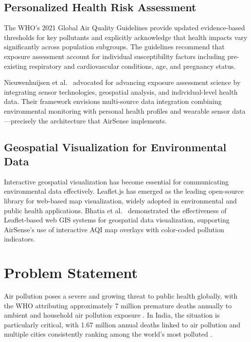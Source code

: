 \documentclass[12pt,a4paper]{report}
\begin{document}
\section{Personalized Health Risk Assessment}

The WHO's 2021 Global Air Quality Guidelines \cite{WHO2021aqg} provide updated evidence-based thresholds for key pollutants and explicitly acknowledge that health impacts vary significantly across population subgroups. The guidelines recommend that exposure assessment account for individual susceptibility factors including pre-existing respiratory and cardiovascular conditions, age, and pregnancy status.

Nieuwenhuijsen et al.~\cite{Nieuwenhuijsen2019exposure} advocated for advancing exposure assessment science by integrating sensor technologies, geospatial analysis, and individual-level health data. Their framework envisions multi-source data integration combining environmental monitoring with personal health profiles and wearable sensor data---precisely the architecture that AirSense implements.

\section{Geospatial Visualization for Environmental Data}

Interactive geospatial visualization has become essential for communicating environmental data effectively. Leaflet.js \cite{Leaflet2024} has emerged as the leading open-source library for web-based map visualization, widely adopted in environmental and public health applications. Bhatia et al.~\cite{Bhatia2018webgis} demonstrated the effectiveness of Leaflet-based web GIS systems for geospatial data visualization, supporting AirSense's use of interactive AQI map overlays with color-coded pollution indicators.


\chapter{Problem Statement}

Air pollution poses a severe and growing threat to public health globally, with the WHO attributing approximately 7 million premature deaths annually to ambient and household air pollution exposure \cite{WHO2014airpollution}. In India, the situation is particularly critical, with 1.67 million annual deaths linked to air pollution and multiple cities consistently ranking among the world's most polluted \cite{CPCB2014naqi}.
\end{document}
